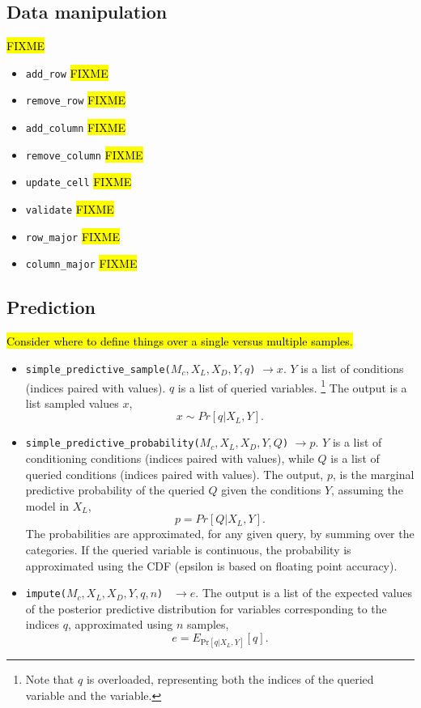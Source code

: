 \documentclass[11pt]{article}
\begin{document}
\subsection{Data manipulation}

\hl{FIXME}

\begin{itemize}
\item \texttt{add\_row} \hl{FIXME}
\item \texttt{remove\_row} \hl{FIXME}
\item \texttt{add\_column} \hl{FIXME}
\item \texttt{remove\_column} \hl{FIXME}
\item \texttt{update\_cell} \hl{FIXME}
\item \texttt{validate} \hl{FIXME}
\item \texttt{row\_major} \hl{FIXME}
\item \texttt{column\_major} \hl{FIXME}

\end{itemize}

\subsection{Prediction}

\hl{Consider where to define things over a single versus multiple samples.}

\begin{itemize}

\item \texttt{simple\_predictive\_sample($M_c, X_L,X_D,Y,q$)} $\rightarrow x$. $Y$ is a list of conditions (indices paired with values). 
$q$ is a list of queried variables.
\footnote{Note that $q$ is overloaded, representing both the indices of the queried variable and the variable.}
The output is a list sampled values $x$,
$$
x \sim Pr[q|X_L,Y].
$$

\item \texttt{simple\_predictive\_probability($M_c,X_L,X_D,Y,Q$)} $\rightarrow p$. $Y$ is a list of conditioning conditions (indices paired with values), while  
$Q$ is a list of queried conditions (indices paired with values). 
The output, $p$, is the marginal predictive probability of the queried $Q$ given the conditions $Y$, assuming the model in $X_L$,
$$
p = Pr[Q | X_L,Y].
$$
The probabilities are approximated, for any given query, by summing over the categories. If the queried variable is continuous, the probability is approximated using the CDF (epsilon is based on floating point accuracy).

\item \texttt{impute($M_c, X_L,X_D,Y,q,n$) } $\rightarrow e$. The output is a list of the expected values of the posterior predictive distribution for variables corresponding to the indices $q$, approximated using $n$ samples,
$$
e = E_{\textrm{Pr}[q | X_L,Y]}[q].
$$

\end{itemize}
\end{document}
